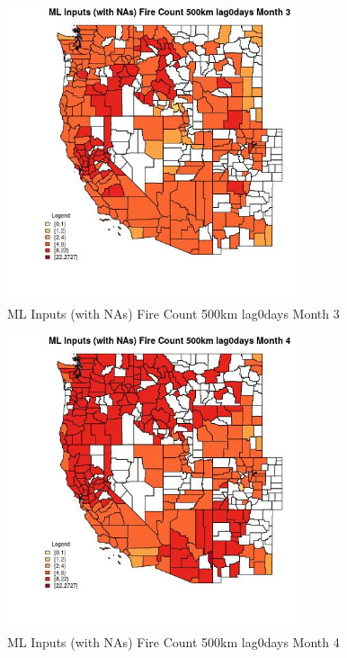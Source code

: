 \begin{figure} 
\centering  
\includegraphics[width=0.77\textwidth]{Code_Outputs/Report_ML_input_PM25_Step4_part_f_de_duplicated_aves_prioritize_24hr_obswNAs_CountyFire_Count_500km_lag0daysmedianMonth3.jpg} 
\caption{\label{fig:Report_ML_input_PM25_Step4_part_f_de_duplicated_aves_prioritize_24hr_obswNAsCountyFire_Count_500km_lag0daysmedianMonth3}ML Inputs (with NAs) Fire Count 500km lag0days Month 3} 
\end{figure} 
 

\begin{figure} 
\centering  
\includegraphics[width=0.77\textwidth]{Code_Outputs/Report_ML_input_PM25_Step4_part_f_de_duplicated_aves_prioritize_24hr_obswNAs_CountyFire_Count_500km_lag0daysmedianMonth4.jpg} 
\caption{\label{fig:Report_ML_input_PM25_Step4_part_f_de_duplicated_aves_prioritize_24hr_obswNAsCountyFire_Count_500km_lag0daysmedianMonth4}ML Inputs (with NAs) Fire Count 500km lag0days Month 4} 
\end{figure} 
 

